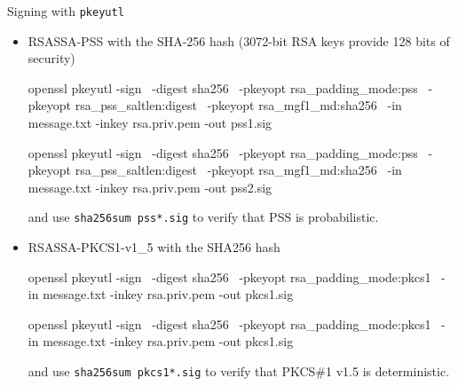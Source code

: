 \documentclass{practice}
\begin{document}
\begin{task}{Signing with \texttt{pkeyutl}}
\begin{itemize}
\begin{cmdblock}
openssl pkeyutl -sign \
  -digest sha384 -pkeyopt nonce-type:1 \
  -in message.txt -inkey ec.priv.pem -out detec2.sig
    \end{cmdblock}
    and use \texttt{sha256sum detec*.sig} to verify that signing is deterministic.

    Deterministic ECDSA support was added to OpenSSL in \href{https://openssl-library.org/news/openssl-3.2-notes\#major-changes-between-openssl-31-and-openssl-320-23-nov-2023}{v3.2}.
    The parameter to enable it is obscure, and the documentation does not help you find it either\dots.

    \item RSASSA-PSS with the SHA-256 hash (3072-bit RSA keys provide 128 bits of security)
    \begin{cmdblock}
openssl pkeyutl -sign \
  -digest sha256 \
  -pkeyopt rsa_padding_mode:pss \
  -pkeyopt rsa_pss_saltlen:digest \
  -pkeyopt rsa_mgf1_md:sha256 \
  -in message.txt -inkey rsa.priv.pem -out pss1.sig

openssl pkeyutl -sign \
  -digest sha256 \
  -pkeyopt rsa_padding_mode:pss \
  -pkeyopt rsa_pss_saltlen:digest \
  -pkeyopt rsa_mgf1_md:sha256 \
  -in message.txt -inkey rsa.priv.pem -out pss2.sig
    \end{cmdblock}
    and use \texttt{sha256sum pss*.sig} to verify that PSS is probabilistic.

    \item RSASSA-PKCS1-v1\_5 with the SHA256 hash
    \begin{cmdblock}
openssl pkeyutl -sign \
  -digest sha256 \
  -pkeyopt rsa_padding_mode:pkcs1 \
  -in message.txt -inkey rsa.priv.pem -out pkcs1.sig

openssl pkeyutl -sign \
  -digest sha256 \
  -pkeyopt rsa_padding_mode:pkcs1 \
  -in message.txt -inkey rsa.priv.pem -out pkcs1.sig
    \end{cmdblock}

    and use \texttt{sha256sum pkcs1*.sig} to verify that PKCS\#1 v1.5 is deterministic.
  \end{itemize}
\end{task}
\end{document}
